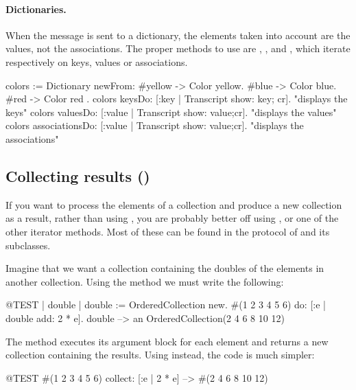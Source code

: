 \documentclass[a4paper,10pt,twoside]{book}
\begin{document}


\paragraph{Dictionaries.}
When the message  is sent to a dictionary, the elements taken into account are the values, not the associations. The proper methods to use are , , and , which iterate respectively on keys, values or associations.

\begin{code}{}
colors := Dictionary newFrom: { #yellow -> Color yellow. #blue -> Color blue. #red -> Color red }.
colors keysDo: [:key | Transcript show: key; cr].                    "displays the keys"
colors valuesDo: [:value | Transcript show: value;cr].            "displays the values"
colors associationsDo: [:value | Transcript show: value;cr].  "displays the associations"
\end{code}

\subsection{Collecting results ()}
If you want to process the elements of a collection and produce a new collection as a result, rather than using , you are probably better off using , or one of the other iterator methods.
Most of these can be found in the  protocol of  and its subclasses.

Imagine that we want a collection containing the doubles of the elements in another collection. Using the method  we must write the following:

\begin{code}{@TEST | double |}
double := OrderedCollection new.
#(1 2 3 4 5 6) do: [:e | double add: 2 * e].
double --> an OrderedCollection(2 4 6 8 10 12)
\end{code}

\noindent
The method  executes its argument block for each element and returns a new collection containing the results. 
Using  instead, the code is much simpler:
\begin{code}{@TEST}
#(1 2 3 4 5 6) collect: [:e | 2 * e] --> #(2 4 6 8 10 12)
\end{code}
\end{document}
